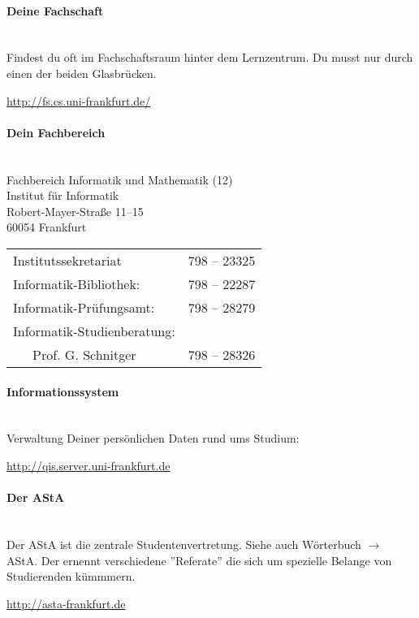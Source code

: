 \spaltenanfang
\paragraph{Deine Fachschaft}~\\
Findest du oft im Fachschaftsraum hinter dem Lernzentrum.
Du musst nur durch einen der beiden Glasbr\"ucken.\\
\begin{center}
\url{http://fs.cs.uni-frankfurt.de/}\\
\emailfachschaft
\end{center}

\paragraph{Dein Fachbereich}~\\
Fachbereich Informatik und Mathematik (12)\\
Institut für Informatik\\
Robert-Mayer-Straße 11–15\\
60054 Frankfurt\\

\begin{tabular}{ll}
Institutssekretariat & 798 – 23325 \\
Informatik-Bibliothek: & 798 – 22287\\
Informatik-Prüfungsamt: & 798 – 28279\\
Informatik-Studienberatung: & \\
~~~Prof. G. Schnitger & 798 – 28326
\end{tabular}

\paragraph{Informationssystem}~\\
Verwaltung Deiner persönlichen Daten rund ums Studium:\\
\begin{center}\url{http://qis.server.uni-frankfurt.de}\end{center}




\paragraph{Der AStA}~\\
Der AStA ist die zentrale Studentenvertretung. Siehe auch Wörterbuch $ \rightarrow $ AStA.
Der ernennt verschiedene ''Referate'' die sich um spezielle Belange von Studierenden k\"ummmern.
\begin{center}\url{http://asta-frankfurt.de}\end{center}


